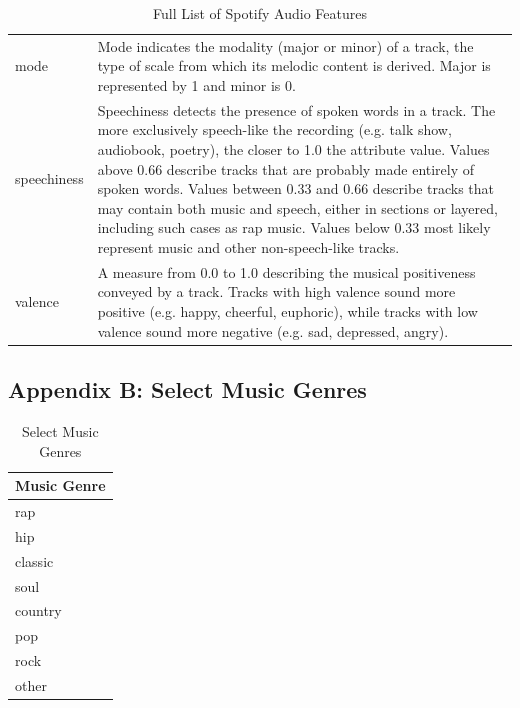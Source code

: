 \documentclass{article}
\begin{document}
\begin{table}[htbp]
\begin{tabular}{l p{}}
        mode & Mode indicates the modality (major or minor) of a track, the type of scale from which its melodic content is derived. Major is represented by 1 and minor is 0. \\[3pt]

        speechiness & Speechiness detects the presence of spoken words in a track. The more exclusively speech-like the recording (e.g. talk show, audiobook, poetry), the closer to 1.0 the attribute value. Values above 0.66 describe tracks that are probably made entirely of spoken words. Values between 0.33 and 0.66 describe tracks that may contain both music and speech, either in sections or layered, including such cases as rap music. Values below 0.33 most likely represent music and other non-speech-like tracks. \\[3pt]

        valence & A measure from 0.0 to 1.0 describing the musical positiveness conveyed by a track. Tracks with high valence sound more positive (e.g. happy, cheerful, euphoric), while tracks with low valence sound more negative (e.g. sad, depressed, angry). \\
        \bottomrule
    \end{tabular}
    \caption{Full List of Spotify Audio Features}
\end{table}

\pagebreak

\subsection*{Appendix B: Select Music Genres}\label{sec:select_music_genres}

\begin{table}[htbp]
    \centering
    \begin{tabular}{l}
        \toprule
        \textbf{Music Genre} \\
        \midrule
        rap \\[3pt]
        hip \\[3pt]
        classic \\[3pt]
        soul \\[3pt]
        country \\[3pt]
        pop \\[3pt]
        rock \\[3pt]
        other \\
        \bottomrule
    \end{tabular}
    \caption{Select Music Genres}
\end{table}
\end{document}
